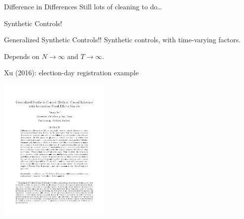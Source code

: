 \documentclass[aspectratio=169]{beamer}
\begin{document}
\begin{frame}{Difference in Differences}
	Still lots of cleaning to do\ldots
\end{frame}

{
\begin{frame}[plain]
\end{frame}
}

\begin{frame}{Synthetic Controls!}
\end{frame}


\begin{frame}{Generalized Synthetic Controls!!}
	Synthetic controls, with time-varying factors.

	Depends on $N\to\infty$ and $T\to\infty$.
\end{frame}

\begin{frame}{Xu (2016): election-day registration example}
	\vspace*{-0.1cm}
	\begin{center}
		\includegraphics[page=25, trim = 2.5cm 15.5cm 2.0cm 3.0cm, clip,height=7cm]{../../../Papers/Econometrics/Xu_2016.pdf}
	\end{center}
\end{frame}
\end{document}

